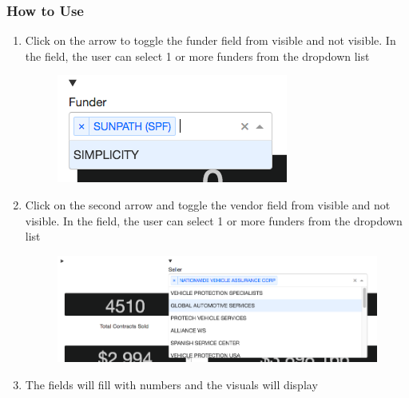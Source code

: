 \documentclass[titlepage]{article}
\begin{document}
\subsubsection{How to Use}
\begin{enumerate}
	\item Click on the arrow to toggle the funder field from visible and not visible. In the field, the user can select 1 or more funders from the dropdown list
	\begin{figure}[h]
		\includegraphics[scale=.5]{./pics/scenario_modeling_funder.png}
	\end{figure}
	\item Click on the second arrow and toggle the vendor field from visible and not visible. In the field, the user can select 1 or more funders from the dropdown list
	\begin{figure}[h]
		\includegraphics[width=\linewidth]{./pics/scenario_modeling_seller.png}
	\end{figure}
	\item The fields will fill with numbers and the visuals will display 
\end{enumerate}
\end{document}

